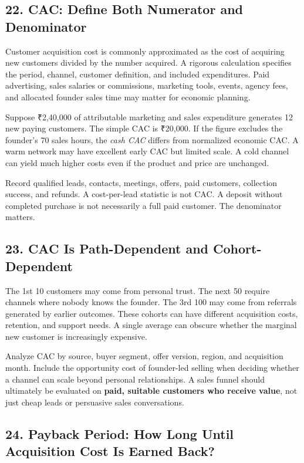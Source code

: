 \subsection*{22. CAC: Define Both Numerator and Denominator}

Customer acquisition cost is commonly approximated as the cost of acquiring new customers divided by the number acquired. A rigorous calculation specifies the period, channel, customer definition, and included expenditures. Paid advertising, sales salaries or commissions, marketing tools, events, agency fees, and allocated founder sales time may matter for economic planning.

Suppose ₹2,40,000 of attributable marketing and sales expenditure generates 12 new paying customers. The simple CAC is ₹20,000. If the figure excludes the founder's 70 sales hours, the \emph{cash CAC} differs from normalized economic CAC. A warm network may have excellent early CAC but limited scale. A cold channel can yield much higher costs even if the product and price are unchanged.

Record qualified leads, contacts, meetings, offers, paid customers, collection success, and refunds. A cost-per-lead statistic is not CAC. A deposit without completed purchase is not necessarily a full paid customer. The denominator matters.

\subsection*{23. CAC Is Path-Dependent and Cohort-Dependent}

The 1st 10 customers may come from personal trust. The next 50 require channels where nobody knows the founder. The 3rd 100 may come from referrals generated by earlier outcomes. These cohorts can have different acquisition costs, retention, and support needs. A single average can obscure whether the marginal new customer is increasingly expensive.

Analyze CAC by source, buyer segment, offer version, region, and acquisition month. Include the opportunity cost of founder-led selling when deciding whether a channel can scale beyond personal relationships. A sales funnel should ultimately be evaluated on \textbf{paid, suitable customers who receive value}, not just cheap leads or persuasive sales conversations.

\subsection*{24. Payback Period: How Long Until Acquisition Cost Is Earned Back?}

